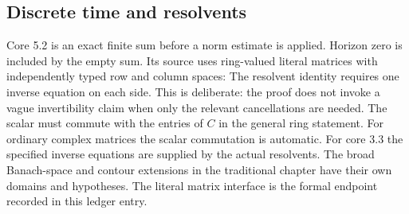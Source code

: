 \subsection{Discrete time and resolvents}
Core 5.2 is an exact finite sum before a norm estimate is applied. Horizon zero is included by the empty sum. Its source uses ring-valued literal matrices with independently typed row and column spaces:
The resolvent identity requires one inverse equation on each side. This is deliberate: the proof does not invoke a vague invertibility claim when only the relevant cancellations are needed. The scalar must commute with the entries of $C$ in the general ring statement.
For ordinary complex matrices the scalar commutation is automatic. For core 3.3 the specified inverse equations are supplied by the actual resolvents. The broad Banach-space and contour extensions in the traditional chapter have their own domains and hypotheses. The literal matrix interface is the formal endpoint recorded in this ledger entry.
